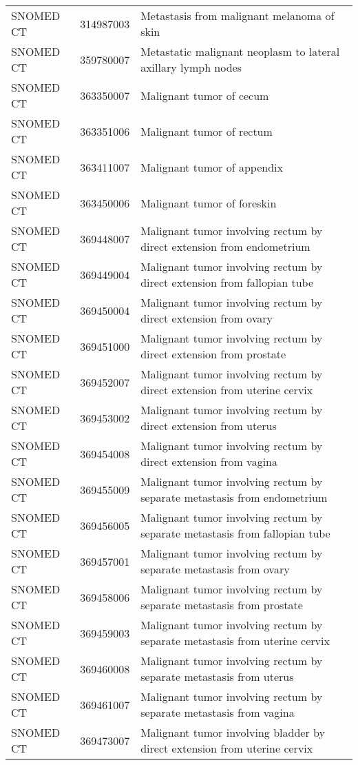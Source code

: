 \begin{longtable}{p{}p{}p{}}
  SNOMED CT & 314987003 & Metastasis from malignant melanoma of skin \\ 
  SNOMED CT & 359780007 & Metastatic malignant neoplasm to lateral axillary lymph nodes \\ 
  SNOMED CT & 363350007 & Malignant tumor of cecum \\ 
  SNOMED CT & 363351006 & Malignant tumor of rectum \\ 
  SNOMED CT & 363411007 & Malignant tumor of appendix \\ 
  SNOMED CT & 363450006 & Malignant tumor of foreskin \\ 
  SNOMED CT & 369448007 & Malignant tumor involving rectum by direct extension from endometrium \\ 
  SNOMED CT & 369449004 & Malignant tumor involving rectum by direct extension from fallopian tube \\ 
  SNOMED CT & 369450004 & Malignant tumor involving rectum by direct extension from ovary \\ 
  SNOMED CT & 369451000 & Malignant tumor involving rectum by direct extension from prostate \\ 
  SNOMED CT & 369452007 & Malignant tumor involving rectum by direct extension from uterine cervix \\ 
  SNOMED CT & 369453002 & Malignant tumor involving rectum by direct extension from uterus \\ 
  SNOMED CT & 369454008 & Malignant tumor involving rectum by direct extension from vagina \\ 
  SNOMED CT & 369455009 & Malignant tumor involving rectum by separate metastasis from endometrium \\ 
  SNOMED CT & 369456005 & Malignant tumor involving rectum by separate metastasis from fallopian tube \\ 
  SNOMED CT & 369457001 & Malignant tumor involving rectum by separate metastasis from ovary \\ 
  SNOMED CT & 369458006 & Malignant tumor involving rectum by separate metastasis from prostate \\ 
  SNOMED CT & 369459003 & Malignant tumor involving rectum by separate metastasis from uterine cervix \\ 
  SNOMED CT & 369460008 & Malignant tumor involving rectum by separate metastasis from uterus \\ 
  SNOMED CT & 369461007 & Malignant tumor involving rectum by separate metastasis from vagina \\ 
  SNOMED CT & 369473007 & Malignant tumor involving bladder by direct extension from uterine cervix \\ 

\end{longtable}
